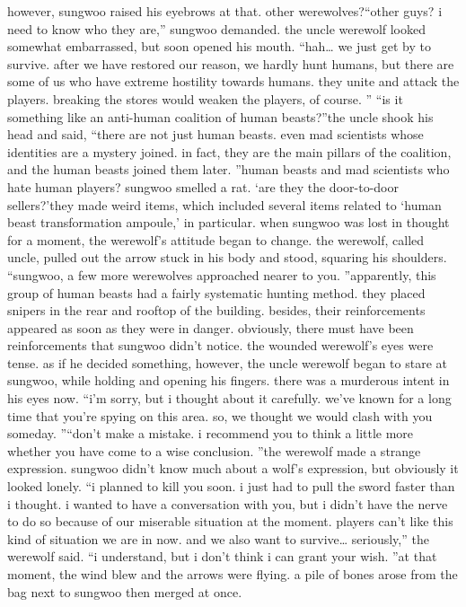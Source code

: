 however, sungwoo raised his eyebrows at that.
 other werewolves?“other guys? i need to know who they are,” sungwoo demanded.
the uncle werewolf looked somewhat embarrassed, but soon opened his mouth.
“hah… we just get by to survive.
 after we have restored our reason, we hardly hunt humans, but there are some of us who have extreme hostility towards humans.
 they unite and attack the players.
 breaking the stores would weaken the players, of course.
”
“is it something like an anti-human coalition of human beasts?”the uncle shook his head and said, “there are not just human beasts.
 even mad scientists whose identities are a mystery joined.
 in fact, they are the main pillars of the coalition, and the human beasts joined them later.
”human beasts and mad scientists who hate human players? sungwoo smelled a rat.
‘are they the door-to-door sellers?’they made weird items, which included several items related to ‘human beast transformation ampoule,’ in particular.
when sungwoo was lost in thought for a moment, the werewolf’s attitude began to change.
 the werewolf, called uncle, pulled out the arrow stuck in his body and stood, squaring his shoulders.
“sungwoo, a few more werewolves approached nearer to you.
”apparently, this group of human beasts had a fairly systematic hunting method.
they placed snipers in the rear and rooftop of the building.
 besides, their reinforcements appeared as soon as they were in danger.
 obviously, there must have been reinforcements that sungwoo didn’t notice.
the wounded werewolf’s eyes were tense.
 as if he decided something, however, the uncle werewolf began to stare at sungwoo, while holding and opening his fingers.
there was a murderous intent in his eyes now.
“i’m sorry, but i thought about it carefully.
 we’ve known for a long time that you’re spying on this area.
 so, we thought we would clash with you someday.
”“don’t make a mistake.
 i recommend you to think a little more whether you have come to a wise conclusion.
”the werewolf made a strange expression.
 sungwoo didn’t know much about a wolf’s expression, but obviously it looked lonely.
“i planned to kill you soon.
 i just had to pull the sword faster than i thought.
 i wanted to have a conversation with you, but i didn’t have the nerve to do so because of our miserable situation at the moment.
 players can’t like this kind of situation we are in now.
 and we also want to survive… seriously,” the werewolf said.
“i understand, but i don’t think i can grant your wish.
”at that moment, the wind blew and the arrows were flying.
a pile of bones arose from the bag next to sungwoo then merged at once.
